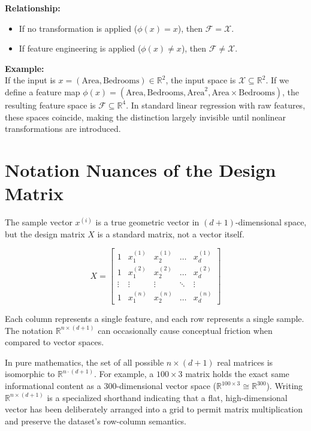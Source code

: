 \documentclass[12pt, a4paper]{report}
\begin{document}
\textbf{Relationship:}
\begin{itemize}
    \item If no transformation is applied ($\phi(x) = x$), then $\mathcal{F} = \mathcal{X}$.
    \item If feature engineering is applied ($\phi(x) \neq x$), then $\mathcal{F} \neq \mathcal{X}$.
\end{itemize}

\textbf{Example:} \\
If the input is $x = (\text{Area}, \text{Bedrooms}) \in \mathbb{R}^2$, the input space is $\mathcal{X} \subseteq \mathbb{R}^2$.
If we define a feature map $\phi(x) = (\text{Area}, \text{Bedrooms}, \text{Area}^2, \text{Area} \times \text{Bedrooms})$, the resulting feature space is $\mathcal{F} \subseteq \mathbb{R}^4$. In standard linear regression with raw features, these spaces coincide, making the distinction largely invisible until nonlinear transformations are introduced.

\section{Notation Nuances of the Design Matrix}

The sample vector $x^{(i)}$ is a true geometric vector in $(d+1)$-dimensional space, but the design matrix $X$ is a standard matrix, not a vector itself.

\[
X = \begin{bmatrix} 1 & x_1^{(1)} & x_2^{(1)} & \dots & x_d^{(1)} \\ 1 & x_1^{(2)} & x_2^{(2)} & \dots & x_d^{(2)} \\ \vdots & \vdots & \vdots & \ddots & \vdots \\ 1 & x_1^{(n)} & x_2^{(n)} & \dots & x_d^{(n)} \end{bmatrix}
\]

Each column represents a single feature, and each row represents a single sample. The notation $\mathbb{R}^{n \times (d+1)}$ can occasionally cause conceptual friction when compared to vector spaces. 

In pure mathematics, the set of all possible $n \times (d+1)$ real matrices is isomorphic to $\mathbb{R}^{n \cdot (d+1)}$. For example, a $100 \times 3$ matrix holds the exact same informational content as a 300-dimensional vector space ($\mathbb{R}^{100 \times 3} \cong \mathbb{R}^{300}$). Writing $\mathbb{R}^{n \times (d+1)}$ is a specialized shorthand indicating that a flat, high-dimensional vector has been deliberately arranged into a grid to permit matrix multiplication and preserve the dataset's row-column semantics.
\end{document}
